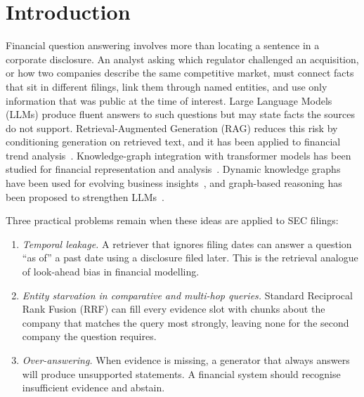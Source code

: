 \documentclass[conference]{IEEEtran}
\begin{document}
\section{Introduction}
Financial question answering involves more than locating a sentence in a corporate disclosure. An analyst asking which regulator challenged an acquisition, or how two companies describe the same competitive market, must connect facts that sit in different filings, link them through named entities, and use only information that was public at the time of interest. Large Language Models (LLMs) produce fluent answers to such questions but may state facts the sources do not support. Retrieval-Augmented Generation (RAG) reduces this risk by conditioning generation on retrieved text, and it has been applied to financial trend analysis~\cite{ertugrul2026rag}. Knowledge-graph integration with transformer models has been studied for financial representation and analysis~\cite{yahathugoda2026kgatfin,yarlagadda2026kg}. Dynamic knowledge graphs have been used for evolving business insights~\cite{jain2025dynamic}, and graph-based reasoning has been proposed to strengthen LLMs~\cite{chai2026graphllm}.

Three practical problems remain when these ideas are applied to SEC filings:
\begin{enumerate}
\item \textit{Temporal leakage.} A retriever that ignores filing dates can answer a question ``as of'' a past date using a disclosure filed later. This is the retrieval analogue of look-ahead bias in financial modelling.
\item \textit{Entity starvation in comparative and multi-hop queries.} Standard Reciprocal Rank Fusion (RRF) can fill every evidence slot with chunks about the company that matches the query most strongly, leaving none for the second company the question requires.
\item \textit{Over-answering.} When evidence is missing, a generator that always answers will produce unsupported statements. A financial system should recognise insufficient evidence and abstain.
\end{enumerate}
\end{document}
